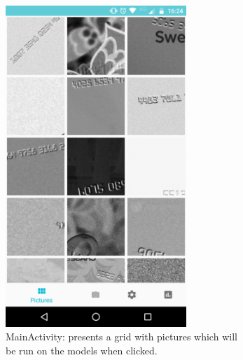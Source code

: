 \documentclass{article}
\begin{document}
\begin{figure}[]
  \captionsetup[subfigure]{position=b}
  \centering 
  \begin{subfigure}[p]{0.45\textwidth}
    \centering
    \includegraphics[width=0.75\textwidth]{img/app/main.png}
    \caption{\footnotesize MainActivity: presents a grid with pictures which will be run on the models when clicked.}
    \label{fig:MainActivity}
  \end{subfigure}
  \quad
  \begin{subfigure}[p]{0.45\textwidth}
    \centering

\end{subfigure}
\end{figure}
\end{document}
